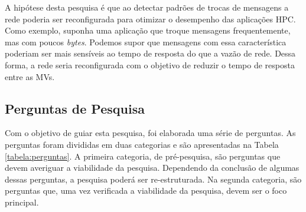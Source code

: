 \documentclass[10pt, conference, compsocconf]{IEEEtran}
\begin{document}
A hipótese desta pesquisa é que ao detectar padrões de trocas de mensagens a rede poderia ser reconfigurada para otimizar o desempenho das aplicações HPC. Como exemplo, suponha uma aplicação que troque mensagens frequentemente, mas com poucos \textit{bytes}. Podemos supor que mensagens com essa característica poderiam ser mais sensíveis ao tempo de resposta do que a vazão de rede. Dessa forma, a rede seria reconfigurada com o objetivo de reduzir o tempo de resposta entre as MVs. 

\subsection{Perguntas de Pesquisa}

Com o objetivo de guiar esta pesquisa, foi elaborada uma série de perguntas. As perguntas foram divididas em duas categorias e são apresentadas na Tabela \ref{tabela:perguntas}. A primeira categoria, de pré-pesquisa, são perguntas que devem averiguar a viabilidade da pesquisa. Dependendo da conclusão de algumas dessas perguntas, a pesquisa poderá ser re-estruturada. Na segunda categoria, são perguntas que, uma vez verificada a viabilidade da pesquisa, devem ser o foco principal.
\end{document}
